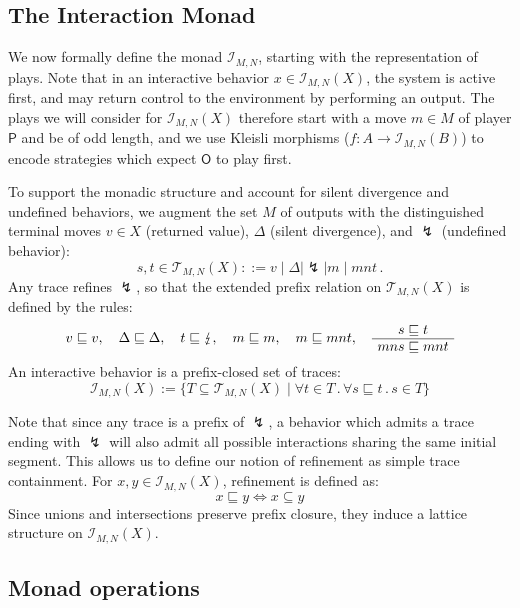 \documentclass[acmsmall,timestamp,review,anonymous]{acmart}
\newcommand{\kw}[1]{\ensuremath{ \mathsf{#1} }}
\begin{document}

\subsection{The Interaction Monad} \label{sec:monad:def} %

We now formally define the monad $\mathcal{I}_{M,N}$,
starting with the representation of plays. 
Note that
in an interactive behavior
$x \in \mathcal{I}_{M,N}(X)$,
the system is active first,
and may return control to the environment
by performing an output.
The plays we will consider for $\mathcal{I}_{M,N}(X)$
therefore start with a move $m \in M$ of player $\kw{P}$
and be of odd length,
and we use Kleisli morphisms
($f : A \rightarrow \mathcal{I}_{M,N}(B)$)
to encode strategies
which expect $\kw{O}$ to play first.

To support the monadic structure and account
for silent divergence and undefined behaviors,
we augment the set $M$ of outputs with the
distinguished terminal moves
$v \in X$ (returned value),
$\Delta$ (silent divergence), and
$\lightning$ (undefined behavior):
\[
    s, t \in
    \mathcal{T}_{M,N}(X) ::=
    v \mid \Delta \mid \lightning \mid m \mid mnt \,.
\]
Any trace refines $\lightning$, so that
the extended prefix relation on $\mathcal{T}_{M,N}(X)$
is defined by the rules:
\begin{gather*}
  v \sqsubseteq v , \quad
  \Delta \sqsubseteq \Delta , \quad
  t \sqsubseteq \lightning , \quad
  m \sqsubseteq m , \quad
  m \sqsubseteq mnt ,
  \quad
  \AxiomC{$s \sqsubseteq t$}
  \UnaryInfC{$mns \sqsubseteq mnt$}
  \DisplayProof
\end{gather*}
An interactive behavior is
a prefix-closed set of traces:
\[
    \mathcal{I}_{M,N}(X) :=
    \{ T \subseteq \mathcal{T}_{M,N}(X) \mid
       \forall t \in T \,.\, \forall s \sqsubseteq t \,.\, s \in T \}
\]

Note that since any trace is a prefix of $\lightning$,
a behavior which admits a trace ending with $\lightning$
will also admit all possible interactions
sharing the same initial segment.
This allows us to define our notion of refinement
as simple trace containment.
For $x, y \in \mathcal{I}_{M,N}(X)$, refinement is defined as:
\[
    x \sqsubseteq y \Leftrightarrow x \subseteq y
\]
Since unions and intersections
preserve prefix closure,
they induce a lattice structure on $\mathcal{I}_{M,N}(X)$.


\subsection{Monad operations} %
\end{document}
